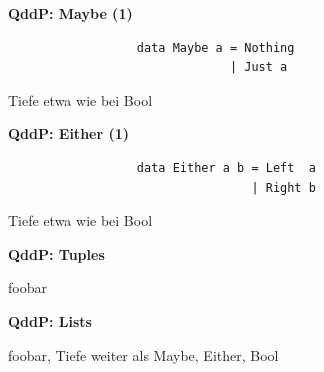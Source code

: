 \documentclass[unknownkeysallowed]{beamer}
\begin{document}
  
  \begin{frame}[fragile]

    \begin{center}
    \Large\textbf{QddP: Maybe (1)}\\\bigskip

\begin{verbatim}
                  data Maybe a = Nothing
                               | Just a
\end{verbatim}

Tiefe etwa wie bei Bool

    \end{center}
\end{frame}

  
  \begin{frame}[fragile]

    \begin{center}
    \Large\textbf{QddP: Either (1)}\\\bigskip

\begin{verbatim}
                  data Either a b = Left  a
                                  | Right b
\end{verbatim}

Tiefe etwa wie bei Bool

    \end{center}
\end{frame}

  
  \begin{frame}[fragile]

    \begin{center}
    \Large\textbf{QddP: Tuples}\\\bigskip

foobar

    \end{center}
\end{frame}

  
  \begin{frame}[fragile]

    \begin{center}
    \Large\textbf{QddP: Lists}\\\bigskip

foobar, Tiefe weiter als Maybe, Either, Bool

    \end{center}
\end{frame}
\end{document}
